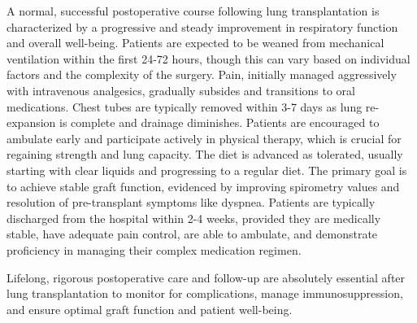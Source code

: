 A normal, successful postoperative course following lung transplantation is characterized by a progressive and steady improvement in respiratory function and overall well-being. Patients are expected to be weaned from mechanical ventilation within the first 24-72 hours, though this can vary based on individual factors and the complexity of the surgery. Pain, initially managed aggressively with intravenous analgesics, gradually subsides and transitions to oral medications. Chest tubes are typically removed within 3-7 days as lung re-expansion is complete and drainage diminishes. Patients are encouraged to ambulate early and participate actively in physical therapy, which is crucial for regaining strength and lung capacity. The diet is advanced as tolerated, usually starting with clear liquids and progressing to a regular diet. The primary goal is to achieve stable graft function, evidenced by improving spirometry values and resolution of pre-transplant symptoms like dyspnea. Patients are typically discharged from the hospital within 2-4 weeks, provided they are medically stable, have adequate pain control, are able to ambulate, and demonstrate proficiency in managing their complex medication regimen.

Lifelong, rigorous postoperative care and follow-up are absolutely essential after lung transplantation to monitor for complications, manage immunosuppression, and ensure optimal graft function and patient well-being.

